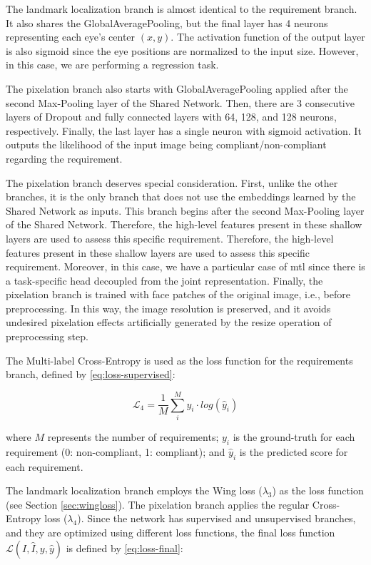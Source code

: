 The landmark localization branch is almost identical to the requirement branch. It also shares the GlobalAveragePooling, but the final layer has 4 neurons representing each eye's center $(x, y)$. The activation function of the output layer is also sigmoid since the eye positions are normalized to the input size. However, in this case, we are performing a regression task.
 
The pixelation branch also starts with GlobalAveragePooling applied after the second Max-Pooling layer of the Shared Network. Then, there are 3 consecutive layers of Dropout and fully connected layers with 64, 128, and 128 neurons, respectively. Finally, the last layer has a single neuron with sigmoid activation. It outputs the likelihood of the input image being compliant/non-compliant regarding the \pixelation requirement.
 
The pixelation branch deserves special consideration. First, unlike the other branches, it is the only branch that does not use the embeddings learned by the Shared Network as inputs. This branch begins after the second Max-Pooling layer of the Shared Network. Therefore, the high-level features present in these shallow layers are used to assess this specific requirement. Therefore, the high-level features present in these shallow layers are used to assess this specific requirement. Moreover, in this case, we have a particular case of \acl{mtl} since there is a task-specific head decoupled from the joint representation. Finally, the pixelation branch is trained with face patches of the original image, i.e., before preprocessing. In this way, the image resolution is preserved, and it avoids undesired pixelation effects artificially generated by the resize operation of preprocessing step. 
 
The Multi-label Cross-Entropy is used as the loss function for the requirements branch, defined by \autoref{eq:loss-supervised}:
 
\begin{equation}
\label{eq:loss-supervised}
\mathcal{L}_4 = \frac{1}{M} \sum_i^M {y_i \cdot log(\hat{y}_i)}
\end{equation}
 
\noindent where $M$ represents the number of requirements; $y_i$ is the ground-truth for each requirement (0: non-compliant, 1: compliant); and $\hat{y}_i$ is the predicted score for each requirement.
 
The landmark localization branch employs the Wing loss ($\lambda_3$) as the loss function (see Section \ref{sec:wingloss}). The pixelation branch applies the regular Cross-Entropy loss ($\lambda_4$). Since the network has supervised and unsupervised branches, and they are optimized using different loss functions, the final loss function $\mathcal{L}(I, \hat{I}, y, \hat{y})$ is defined by \autoref{eq:loss-final}:
 
